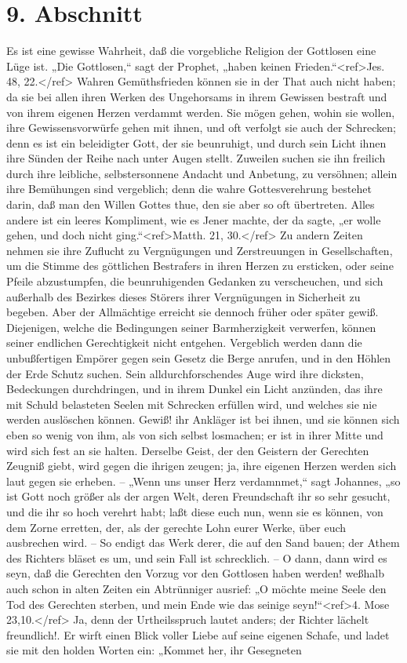\section{9. Abschnitt}

Es ist eine gewisse Wahrheit, daß die vorgebliche Religion der Gottlosen eine Lüge ist. „Die Gottlosen,“ sagt der Prophet, „haben keinen Frieden.“<ref>Jes. 48, 22.</ref> Wahren Gemüthsfrieden können sie in der That auch nicht haben; da sie bei allen ihren Werken des Ungehorsams in ihrem Gewissen bestraft und von ihrem eigenen Herzen verdammt werden. Sie mögen gehen, wohin sie wollen, ihre Gewissensvorwürfe gehen mit ihnen, und oft verfolgt sie auch der Schrecken; denn es ist ein beleidigter Gott, der sie beunruhigt, und durch sein Licht ihnen ihre Sünden der Reihe nach unter Augen stellt. Zuweilen suchen sie ihn freilich durch ihre leibliche, selbstersonnene Andacht und Anbetung, zu versöhnen; allein ihre Bemühungen sind vergeblich; denn die wahre Gottesverehrung bestehet darin, daß man den Willen Gottes thue, den sie aber so oft übertreten. Alles andere ist ein leeres Kompliment, wie es Jener machte, der da sagte, „er wolle gehen, und doch nicht ging.“<ref>Matth. 21, 30.</ref> Zu andern Zeiten nehmen sie ihre Zuflucht zu Vergnügungen und Zerstreuungen in Gesellschaften, um die Stimme des göttlichen Bestrafers in ihren Herzen zu ersticken, oder seine Pfeile abzustumpfen, die beunruhigenden Gedanken zu verscheuchen, und sich außerhalb des Bezirkes dieses Störers ihrer Vergnügungen in Sicherheit zu begeben. Aber der Allmächtige erreicht sie dennoch früher oder später gewiß. Diejenigen, welche die Bedingungen seiner Barmherzigkeit verwerfen, können seiner endlichen Gerechtigkeit nicht entgehen. Vergeblich werden dann die unbußfertigen Empörer gegen sein Gesetz die Berge anrufen, und in den Höhlen der Erde Schutz suchen. Sein alldurchforschendes Auge wird ihre dicksten, Bedeckungen durchdringen, und in ihrem Dunkel ein Licht anzünden, das ihre mit Schuld belasteten Seelen mit Schrecken erfüllen wird, und welches sie nie werden auslöschen können. Gewiß! ihr Ankläger ist bei ihnen, und sie können sich eben so wenig von ihm, als von sich selbst losmachen; er ist in ihrer Mitte und wird sich fest an sie halten. Derselbe Geist, der den Geistern der Gerechten Zeugniß giebt, wird gegen die ihrigen zeugen; ja, ihre eigenen Herzen werden sich laut gegen sie erheben. – „Wenn uns unser Herz verdamnmet,“ sagt Johannes, „so ist Gott noch größer als der argen Welt, deren Freundschaft ihr so sehr gesucht, und die ihr so hoch verehrt habt; laßt diese euch nun, wenn sie es können, von dem Zorne erretten, der, als der gerechte Lohn eurer Werke, über euch ausbrechen wird. – So endigt das Werk derer, die auf den Sand bauen; der Athem des Richters bläset es um, und sein Fall ist schrecklich. – O dann, dann wird es seyn, daß die Gerechten den Vorzug vor den Gottlosen haben werden! weßhalb auch schon in alten Zeiten ein Abtrünniger ausrief: „O möchte meine Seele den Tod des Gerechten sterben, und mein Ende wie das seinige seyn!“<ref>4. Mose 23,10.</ref> Ja, denn der Urtheilsspruch lautet anders; der Richter lächelt freundlich!. Er wirft einen Blick voller Liebe auf seine eigenen Schafe, und ladet sie mit den holden Worten ein: „Kommet her, ihr Gesegneten 